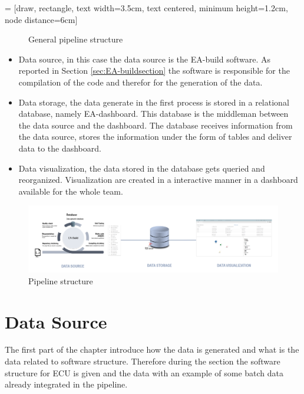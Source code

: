 \documentclass[../main.tex]{subfiles}
\begin{document}
 = [draw, rectangle, text width=3.5cm, text centered, minimum height=1.2cm, node distance=6cm]
\begin{figure}[h]
  \centering
{}
  \caption{General pipeline structure}
  \label{pipelinestructure}
\end{figure}

\begin{itemize}
    \item Data source, in this case the data source is the EA-build software. As reported in Section \ref{sec:EA-buildsection} the software is responsible for the compilation of the code and therefor for the generation of the data. 
    \item Data storage, the data generate in the first process is stored in a relational database, namely EA-dashboard. This database is the middleman between the data source and the dashboard. The database receives information from the data source, stores the information under the form of tables and deliver data to the dashboard.
    \item Data visualization, the data stored in the database gets queried and reorganized. Visualization are created in a interactive manner in a dashboard available for the whole team.
\end{itemize}
\begin{figure}[h]
    \centering
    \includegraphics[width=\linewidth]{images_folder/pipeline_1.png}
    \caption{Pipeline structure}
    \label{fig:pipeline1}
\end{figure}
\section{Data Source}\label{sec:datasource}
The first part of the chapter introduce how the data is generated and what is the data related to software structure. Therefore during the section the software structure for \gls{ECU} is given and the data with an example of some batch data already integrated in the pipeline.
\end{document}
